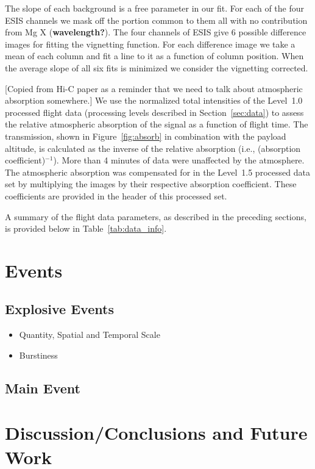         The slope of each background is a free parameter in our fit.
        For each of the four ESIS channels we mask off the portion common to them all with no contribution from Mg X (\textbf{wavelength?}).
        The four channels of ESIS give 6 possible difference images for fitting the vignetting function. 
        For each difference image we take a mean of each column and fit a line to it as a function of column position.
        When the average slope of all six fits is minimized we consider the vignetting corrected. 
        
        
        [Copied from Hi-C paper as a reminder that we need to talk about atmospheric absorption somewhere.] We use the normalized total intensities of the Level~1.0 processed flight data (processing levels described in Section~\ref{sec:data}) to assess the relative atmospheric absorption of the signal as a function of flight time.  The transmission, shown in Figure~\ref{fig:absorb} in combination with the payload altitude, is calculated as the inverse of the relative absorption (i.e., (absorption coefficient)$^{-1}$). More than 4 minutes of data were unaffected by the atmosphere.  The atmospheric absorption was compensated for in the Level~1.5 processed data set by multiplying the images by their respective absorption coefficient.  These coefficients are provided in the header of this processed set.
        
        
        A summary of the flight data parameters, as described in the preceding sections, is provided below in Table~\ref{tab:data_info}. 



\section{Events}
    \subsection{Explosive Events}
        \begin{itemize}
            \item Quantity, Spatial and Temporal Scale
            \item Burstiness 
        \end{itemize}
    
    \subsection{Main Event}

\section{Discussion/Conclusions and Future Work}

